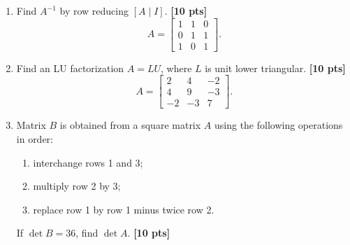 \documentclass[11pt]{article}
\newif\ifshowsolutions
\newcommand{\pts}[1]{\hfill\textbf{[#1 pts]}}
\newcommand{\workarea}[1]{\ifshowsolutions\else\vspace{#1}\fi}
\newcommand{\solution}[1]{%
  \ifshowsolutions
    \par\medskip
    {\color{solutionblue}\textbf{Solution.} #1}
    \par\medskip
  \fi}
\begin{document}
\begin{enumerate}
\item Find $A^{-1}$ by row reducing $[A\mid I]$. \pts{10}
\[
A=\begin{bmatrix}
1&1&0\\
0&1&1\\
1&0&1
\end{bmatrix}.
\]
\workarea{2.5in}
\solution{Row reduction gives
\[
\boxed{A^{-1}=\frac12
\begin{bmatrix}
1&-1&1\\
1&1&-1\\
-1&1&1
\end{bmatrix}}.
\]
Multiplication verifies $AA^{-1}=I_3$.}

\newpage
\item Find an LU factorization $A=LU$, where $L$ is unit lower triangular. \pts{10}
\[
A=\begin{bmatrix}
2&4&-2\\
4&9&-3\\
-2&-3&7
\end{bmatrix}.
\]
\workarea{2.7in}
\solution{Use multipliers $m_{21}=2$, $m_{31}=-1$, and $m_{32}=1$. Then
\[
\boxed{
L=\begin{bmatrix}1&0&0\\2&1&0\\-1&1&1\end{bmatrix},
\qquad
U=\begin{bmatrix}2&4&-2\\0&1&1\\0&0&4\end{bmatrix}}
\]
and $LU=A$.}

\item Matrix $B$ is obtained from a square matrix $A$ using the following operations in order:
\begin{enumerate}[label=(\roman*)]
  \item interchange rows 1 and 3;
  \item multiply row 2 by $3$;
  \item replace row 1 by row 1 minus twice row 2.
\end{enumerate}
If $\det B=36$, find $\det A$. \pts{10}
\workarea{2.0in}
\solution{The interchange multiplies the determinant by $-1$, the scaling multiplies it by $3$, and the row replacement does not change it. Thus
\[
36=(-1)(3)\det A,
\qquad
\boxed{\det A=-12}.
\]}


\end{enumerate}
\end{document}

